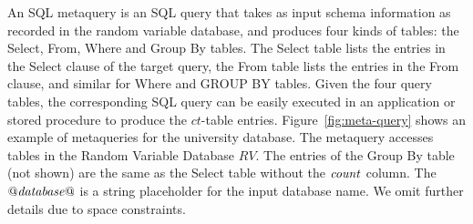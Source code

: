 \documentclass{vldb}
\newcommand{\ct}{\mathit{ct}}
\begin{document}
%
%
%
An SQL metaquery is an SQL query that takes as input schema information as recorded in the random variable database,
and produces four kinds of tables: the Select, From, Where and Group By tables. The Select table lists the entries in the Select clause of the target query, the From table lists the entries in the From clause, and similar for Where and GROUP BY tables. %
Given the four query tables, the corresponding SQL query can be easily executed in an application or stored procedure to produce the $\ct$-table entries.
Figure~\ref{fig:meta-query} shows an example of metaqueries for the university database. The metaquery accesses tables in the Random Variable Database $RV$. The entries of the Group By table (not shown) are the same as the Select table without the $\it{count}$ column.
The $\it{@database@}$ is a string placeholder for the input database name. We omit further details due to space constraints.
\end{document}

